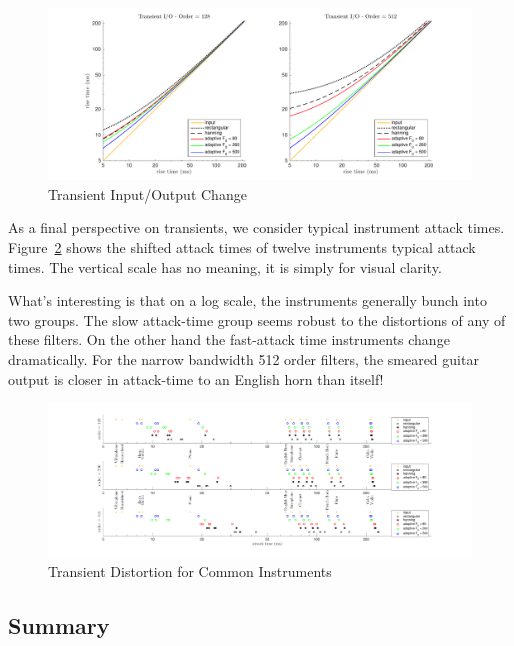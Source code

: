 \documentclass [11pt, proquest,oneside] {ganter_thesis}[2015/03/03]
\begin{document}
\begin{figure}[!ht]
  \centering
    \includegraphics[width=1\textwidth]{transient_2}
    \caption{Transient Input/Output Change}\label{fig:transient_2}
\end{figure}

As a final perspective on transients, we consider typical instrument attack times.  Figure~\ref{fig:transient_3} shows the shifted attack times of twelve instruments typical attack times.  The vertical scale has no meaning, it is simply for visual clarity.

What's interesting is that on a log scale, the instruments generally bunch into two groups.  The slow attack-time group seems robust to the distortions of any of these filters.  On the other hand the fast-attack time instruments change dramatically.  For the narrow bandwidth 512 order filters, the smeared guitar output is closer in attack-time to an English horn than itself!

\begin{figure}[!ht]
  \centering
    \includegraphics[width=1.2\textwidth]{transient_3}
    \caption{Transient Distortion for Common Instruments}\label{fig:transient_3}
\end{figure}

\clearpage

\subsection{Summary}
\end{document}
